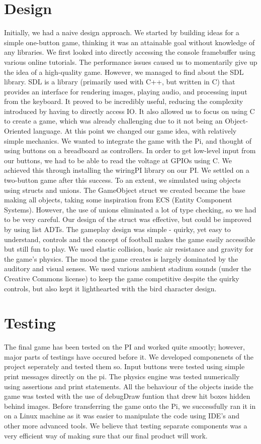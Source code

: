 \documentclass[11pt]{article}
\begin{document}
\section{Design}
Initially, we had a naive design approach. We started by building ideas for a simple one-button game, thinking it was an attainable goal without knowledge of any libraries. We first looked into directly accessing the console framebuffer using various online tutorials. The performance issues caused us to momentarily give up the idea of a high-quality game.
However, we managed to find about the SDL library. SDL is a library (primarily used with C++, but written in C) that provides an interface for rendering images, playing audio, and processing input from the keyboard. It proved to be incredibly useful, reducing the complexity introduced by having to directly access IO. It also allowed us to focus on using C to create a game, which was already challenging due to it not being an Object-Oriented language. At this point we changed our game idea, with relatively simple mechanics.
We wanted to integrate the game with the Pi, and thought of using buttons on a breadboard as controllers. In order to get low-level input from our buttons, we had to be able to read the voltage at GPIOs using C. We achieved this through installing the wiringPI library on our PI. We settled on a two-button game after this success.
To an extent, we simulated using objects using structs and unions. The GameObject struct we created became the base making all objects, taking some inspiration from ECS (Entity Component Systems). However, the use of unions eliminated a lot of type checking, so we had to be very careful. Our design of the struct was effective, but could be improved by using list ADTs.
The gameplay design was simple - quirky, yet easy to understand, controls and the concept of football makes the game easily accessible but still fun to play. We used elastic collision, basic air resistance and gravity for the game's physics.
The mood the game creates is largely dominated by the auditory and visual senses. We used various ambient stadium sounds (under the Creative Commons license) to keep the game competitive despite the quirky controls, but also kept it lighthearted with the bird character design.

\section{Testing}
The final game has been tested on the PI and worked quite smootly; however, major parts of testings have occured before it. We developed componenets of the project seperately and tested them so. Input buttons were tested using simple print messages directly on the pi. The physics engine was tested numerically using assertions and print statements. All the behaviour of the objects inside the game was tested with the use of debugDraw funtion that drew hit boxes hidden behind images. Before transferring the game onto the Pi, we successfully ran it in on a Linux machine as it was easier to manipulate the code using IDE's and other more advanced tools. We believe that testing separate components was a very efficient way of making sure that our final product will work. 
\end{document}

